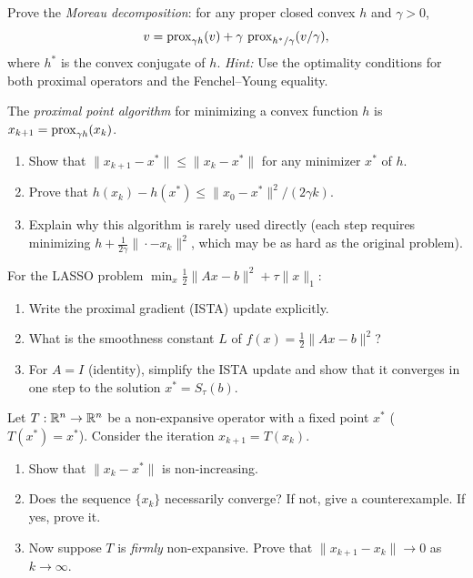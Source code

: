 \documentclass[11pt,a4paper]{article}
\begin{document}
\begin{exercise}\label{ex:moreau-decomp}
Prove the \emph{Moreau decomposition}: for any proper closed convex
$h$ and $\gamma > 0$,
\[
  v = \operatorname{prox}_{\gamma h}(v) + \gamma\,\operatorname{prox}_{h^*/\gamma}(v/\gamma),
\]
where $h^*$ is the convex conjugate of $h$.
\emph{Hint:} Use the optimality conditions for both proximal operators
and the Fenchel--Young equality.
\end{exercise}

\begin{exercise}%
\label{ex:prox-point}
The \emph{proximal point algorithm} for minimizing a convex function
$h$ is $x_{k+1} = \operatorname{prox}_{\gamma h}(x_k)$.
\begin{enumerate}[label=(\alph*)]
  \item Show that $\|x_{k+1} - x^*\| \le \|x_k - x^*\|$ for any
    minimizer $x^*$ of $h$.
  \item Prove that $h(x_k) - h(x^*) \le \|x_0 - x^*\|^2/(2\gamma k)$.
  \item Explain why this algorithm is rarely used directly
    (each step requires minimizing $h + \frac{1}{2\gamma}\|\cdot - x_k\|^2$,
    which may be as hard as the original problem).
\end{enumerate}
\end{exercise}

\begin{exercise}\label{ex:ista-lasso}
For the LASSO problem $\min_x \frac{1}{2}\|Ax - b\|^2 + \tau\|x\|_1$:
\begin{enumerate}[label=(\alph*)]
  \item Write the proximal gradient (ISTA) update explicitly.
  \item What is the smoothness constant $L$ of $f(x) = \frac{1}{2}\|Ax-b\|^2$?
  \item For $A = I$ (identity), simplify the ISTA update and show that
    it converges in one step to the solution
    $x^* = S_\tau(b)$.
\end{enumerate}
\end{exercise}

\begin{exercise}%
\label{ex:nonexpansive-convergence}
Let $T : \mathbb{R}^n \to \mathbb{R}^n$ be a non-expansive operator with a fixed point
$x^*$ ($T(x^*) = x^*$). Consider the iteration $x_{k+1} = T(x_k)$.
\begin{enumerate}[label=(\alph*)]
  \item Show that $\|x_k - x^*\|$ is non-increasing.
  \item Does the sequence $\{x_k\}$ necessarily converge? If not, give
    a counterexample. If yes, prove it.
  \item Now suppose $T$ is \emph{firmly} non-expansive. Prove that
    $\|x_{k+1} - x_k\| \to 0$ as $k \to \infty$.
\end{enumerate}
\end{exercise}
\end{document}
